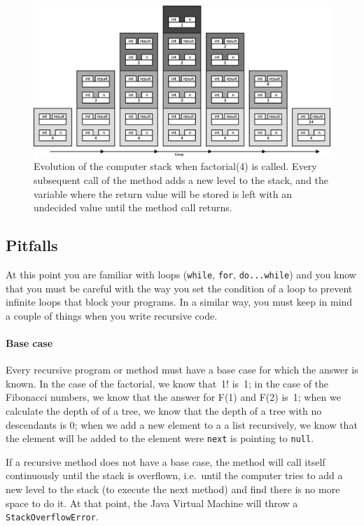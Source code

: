 \begin{figure}[hbtp]
  \centering
  \includegraphics[width=\textwidth]{gfx/recursive-factorial}
  \caption{Evolution of the computer stack when factorial(4) is
    called. Every subsequent call of the method adds a new level to
    the stack, and the variable where the return value will be stored
    is left with an undecided value until the method call returns.}
  \label{fig:fact}
\end{figure}

\subsection{Pitfalls}
\label{sec:pitfalls}

At this point you are familiar with loops (\verb+while+, \verb+for+,
\verb+do...while+) and you know that you must be careful with the
way you set the condition of a loop to prevent infinite loops that
block your programs. In a similar way, you must keep in mind a couple
of things when you write recursive code. 

\paragraph{Base case}
\label{sec:base-case}

Every recursive program or method must have a base case for which the
answer is known. In the case of the factorial, we know that~1! is~1;
in the case of the Fibonacci numbers, we know 
that the answer for F(1) and F(2) is~1; when we calculate the depth of
of a tree, we know that the depth of a tree with no descendants is 0;
when we add a new element to a a list recursively, we know that the
element will be added to the element were \verb+next+ is pointing to
\verb+null+. 

If a recursive method does not have a base case, the method will call
itself continuously until the stack is overflown, i.e.~until the
computer tries to add a new level to the stack (to execute the next
method) and find there is no more space to do it. At that point, the
Java Virtual Machine will throw a \verb+StackOverflowError+. 

